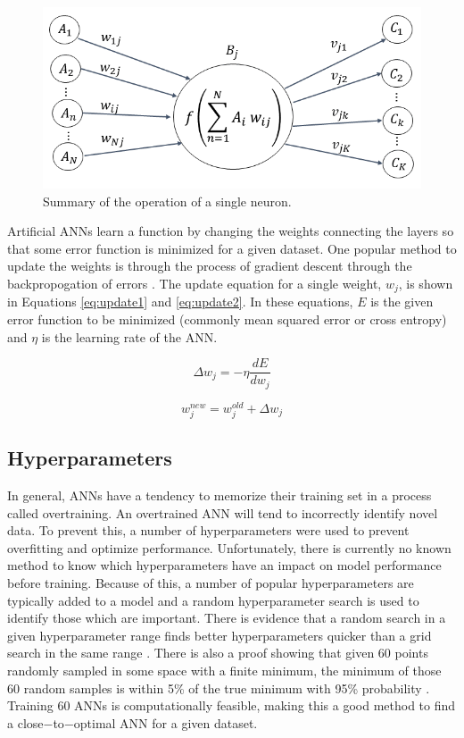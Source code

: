 \documentclass[tocnosub,noragright,centerchapter,12pt,fullpage]{uiucecethesis09}
\begin{document}
\begin{figure}
	\centering
	\includegraphics[width=0.65\linewidth]{images/Node_ABC_2}
	\caption{Summary of the operation of a single neuron.}
	\label{fig:Node}
\end{figure}

Artificial ANNs learn a function by changing the weights connecting the layers so that some error function is minimized for a given dataset. One popular method to update the weights is through the process of gradient descent through the backpropogation of errors \cite{Rumelhart1986}. The update equation for a single weight, $w_j$, is shown in Equations \ref{eq:update1} and \ref{eq:update2}. In these equations, $E$ is the given error function to be minimized (commonly mean squared error or cross entropy) and $\eta$ is the learning rate of the ANN.


\begin{equation} \label{eq:update1}
\Delta w_{j} = - \eta \frac{dE}{dw_j}
\end{equation}

\begin{equation} \label{eq:update2}
w^{new}_{j} = w^{old}_{j} + \Delta w_{j}
\end{equation}

\subsection{Hyperparameters}

In general, ANNs have a tendency to memorize their training set in a process called overtraining. An overtrained ANN will tend to incorrectly identify novel data. To prevent this, a number of hyperparameters were used to prevent overfitting and optimize performance. Unfortunately, there is currently no known method to know which hyperparameters have an impact on model performance before training. Because of this, a number of popular hyperparameters are typically added to a model and a random hyperparameter search is used to identify those which are important. There is evidence that a random search in a given hyperparameter range finds better hyperparameters quicker than a grid search in the same range \cite{Bergstra2012}. There is also a proof showing that given 60 points randomly sampled in some space with a finite minimum, the minimum of those 60 random samples is within 5\% of the true minimum with 95\% probability \cite{Zheng2015}. Training 60 ANNs is computationally feasible, making this a good method to find a close$-$to$-$optimal ANN for a given dataset. 
\end{document}
